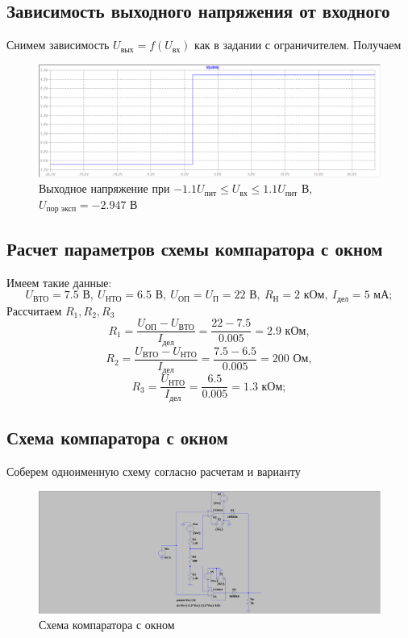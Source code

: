 \documentclass[a4paper, 12pt]{article}
\begin{document}
    \subsection{Зависимость выходного напряжения от входного}
    Снимем зависимость $U_\text{вых}=f\left( U_\text{вх} \right)$ как в задании с ограничителем.
    Получаем
    \begin{figure}[H]
        \centering
        \includegraphics[scale=0.46]{7task_fuin.png}
        \captionsetup{skip=0pt}
        \caption{Выходное напряжение при $-1.1U_\text{пит}\leq U_\text{вх}\leq 1.1U_\text{пит}$ В, $U_\text{пор эксп}=-2.947$ В}
        \label{fig:7task_fuin}
    \end{figure}


    \subsection{Расчет параметров схемы компаратора с окном}
    Имеем такие данные:
    $$
    U_\text{ВТО}=7.5\text{ В},\ U_\text{НТО}=6.5\text{ В},\ U_\text{ОП}=U_\text{П}=22\text{ В},\ R_\text{Н}=2\text{ кОм},\ I_\text{дел}=5\text{ мА};
    $$
    Рассчитаем $R_1,R_2,R_3$
    $$
    R_1=\dfrac{U_\text{ОП}-U_\text{ВТО}}{I_\text{дел}}=\dfrac{22-7.5}{0.005}=2.9\text{ кОм},
    $$
    $$
    R_2=\dfrac{U_\text{ВТО}-U_\text{НТО}}{I_\text{дел}}=\dfrac{7.5-6.5}{0.005}=200\text{ Ом},
    $$
    $$
    R_3=\dfrac{U_\text{НТО}}{I_\text{дел}}=\dfrac{6.5}{0.005}=1.3\text{ кОм};
    $$


    \subsection{Схема компаратора с окном}
    Соберем одноименную схему согласно расчетам и варианту
    \begin{figure}[H]
        \centering
        \includegraphics[scale=0.22]{scheme11.png}
        \captionsetup{skip=0pt}
        \caption{Схема компаратора с окном}
        \label{fig:scheme11}
    \end{figure}
\end{document}
